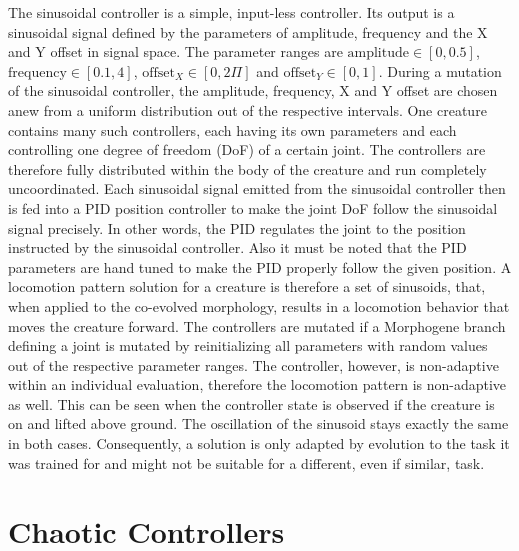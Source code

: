 \documentclass[main]{subfiles}
\begin{document}
The sinusoidal controller is a simple, input-less controller. %
%
Its output is a sinusoidal signal defined by the parameters of amplitude, frequency and the X and Y offset in signal space. %
%
The parameter ranges are $\text{amplitude} \in [0,0.5]$, $\text{frequency} \in [0.1,4]$, $\text{offset}_X \in [0,2\Pi]$ and $\text{offset}_Y \in [0,1]$. %
%
During a mutation of the sinusoidal controller, the amplitude, frequency, X and Y offset are chosen anew from a uniform distribution out of the respective intervals.%
%
One creature contains many such controllers, each having its own parameters and each controlling one degree of freedom (DoF) of a certain joint. %
%
The controllers are therefore fully distributed within the body of the creature and run completely uncoordinated. %
%
Each sinusoidal signal emitted from the sinusoidal controller then is fed into a PID position controller to make the joint DoF follow the sinusoidal signal precisely. %
%
In other words, the PID regulates the joint to the position instructed by the sinusoidal controller. %
%
Also it must be noted that the PID parameters are hand tuned to make the PID properly follow the given position. %
%
A locomotion pattern solution for a creature is therefore a set of sinusoids, that, when applied to the co-evolved morphology, results in a locomotion behavior that moves the creature forward. %
%
The controllers are mutated if a Morphogene branch defining a joint is mutated by reinitializing all parameters with random values out of the respective parameter ranges. %
%
The controller, however, is non-adaptive within an individual evaluation, therefore the locomotion pattern is non-adaptive as well. %
%
This can be seen when the controller state is observed if the creature is on and lifted above ground. %
%
The oscillation of the sinusoid stays exactly the same in both cases. %
%
Consequently, a solution is only adapted by evolution to the task it was trained for and might not be suitable for a different, even if similar, task.

\section{Chaotic Controllers}
\label{sec:chaotic-controllers}
\end{document}
